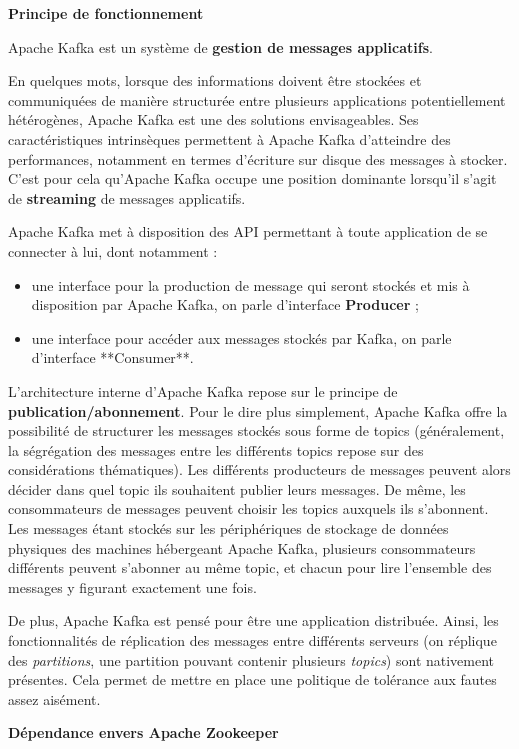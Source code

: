 \documentclass[a4paper,oneside,12pt]{article}
\begin{document}
\textbf{Principe de fonctionnement}

Apache Kafka est un système de \textbf{gestion de messages applicatifs}. 

En quelques mots, lorsque des informations doivent être stockées et 
communiquées de manière structurée entre plusieurs applications 
potentiellement hétérogènes, Apache Kafka est une des solutions 
envisageables. Ses caractéristiques intrinsèques permettent à Apache 
Kafka d'atteindre des performances, notamment en termes d'écriture
sur disque des messages à stocker. C'est pour cela qu'Apache Kafka 
occupe une position dominante lorsqu'il s'agit de \textbf{streaming} de
messages applicatifs.

Apache Kafka met à disposition des API permettant à toute application 
de se connecter à lui, dont notamment :
\begin{itemize}
\item une interface pour la production de message qui seront stockés 
et mis à disposition par Apache Kafka, on parle d'interface 
\textbf{Producer} ;
\item une interface pour accéder aux messages stockés par Kafka, on parle d'interface **Consumer**.
\end{itemize}

L'architecture interne d'Apache Kafka repose sur le principe de 
\textbf{publication/abonnement}. Pour le dire plus simplement, Apache Kafka
offre la possibilité de structurer les messages stockés sous forme
de topics (généralement, la ségrégation des messages entre les
différents topics repose sur des considérations thématiques).
Les différents producteurs de messages peuvent alors décider dans
quel topic ils souhaitent publier leurs messages. 
De même, les consommateurs de messages peuvent choisir les topics
auxquels ils s'abonnent. Les messages étant stockés sur les 
périphériques de stockage de données physiques des machines hébergeant
Apache Kafka, plusieurs consommateurs différents peuvent s'abonner au
même topic, et chacun pour lire l'ensemble des messages y figurant
exactement une fois.

De plus, Apache Kafka est pensé pour être une application distribuée.
Ainsi, les fonctionnalités de réplication des messages entre 
différents serveurs (on réplique des \textit{partitions}, une partition 
pouvant contenir plusieurs \textit{topics}) sont nativement présentes.
Cela permet de mettre en place une politique de tolérance aux fautes
assez aisément.

\textbf{Dépendance envers Apache Zookeeper}
\end{document}
